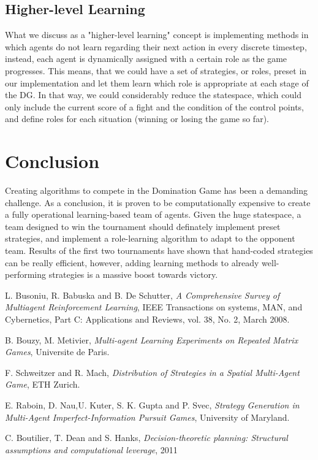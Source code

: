 \documentclass[conference]{IEEEtran}
\begin{document}
\subsection{Higher-level Learning}
What we discuss as a "higher-level learning" concept is implementing methods in which agents do not learn regarding their next action in every discrete timestep, instead, each agent is dynamically assigned with a certain role as the game progresses. This means, that we could have a set of strategies, or roles, preset in our implementation and let them learn which role is appropriate at each stage of the DG. In that way, we could considerably reduce the statespace, which could only include the current score of a fight and the condition of the control points, and define roles for each situation (winning or losing the game so far).

\section{Conclusion}

Creating algorithms to compete in the Domination Game has been a demanding challenge. As a conclusion, it is proven to be computationally expensive to create a fully operational learning-based team of agents. Given the huge statespace, a team designed to win the tournament should definately implement preset strategies, and implement a role-learning algorithm to adapt to the opponent team. Results of the first two tournaments have shown that hand-coded strategies can be really efficient, however, adding learning methods to already well-performing strategies is a massive boost towards victory.


\begin{thebibliography}{9}

L. Busoniu, R. Babuska and B. De Schutter, \emph{A Comprehensive Survey of Multiagent Reinforcement Learning}, IEEE Transactions on systems, MAN, and Cybernetics, Part C: Applications and Reviews, vol. 38, No. 2, March 2008.

B. Bouzy, M. Metivier, \emph{Multi-agent Learning Experiments on Repeated Matrix Games}, Universite de Paris.

F. Schweitzer and R. Mach, \emph{Distribution of Strategies in a Spatial Multi-Agent Game}, ETH Zurich.

E. Raboin, D. Nau,U. Kuter, S. K. Gupta and P. Svec, \emph{Strategy Generation in Multi-Agent Imperfect-Information
Pursuit Games}, University of Maryland.

C. Boutilier, T. Dean and S. Hanks, \emph{Decision-theoretic planning: Structural assumptions and computational leverage}, 2011

\end{thebibliography}
\end{document}
